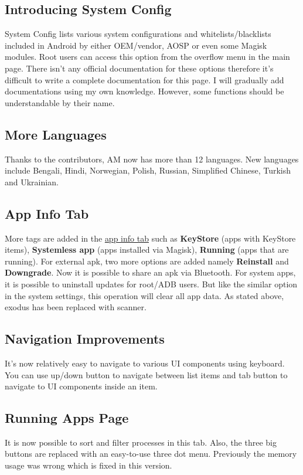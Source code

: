 \subsection{Introducing System Config}
System Config lists various system configurations and whitelists/blacklists included in Android by either OEM/vendor,
AOSP or even some Magisk modules. Root users can access this option from the overflow menu in the main page.
There isn't any official documentation for these options therefore it's difficult to write a complete documentation
for this page. I will gradually add documentations using my own knowledge. However, some functions should be
understandable by their name.

\subsection{More Languages}
Thanks to the contributors, AM now has more than 12 languages. New languages include Bengali, Hindi, Norwegian, Polish,
Russian, Simplified Chinese, Turkish and Ukrainian.

\subsection{App Info Tab}
More tags are added in the \hyperref[subsec:app-info-tab]{app info tab} such as \textbf{KeyStore} (apps with KeyStore
items), \textbf{Systemless app} (apps installed via Magisk), \textbf{Running} (apps that are running). For external apk,
two more options are added namely \textbf{Reinstall} and \textbf{Downgrade}. Now it is possible to share an apk via
Bluetooth. For system apps, it is possible to uninstall updates for root/ADB users. But like the similar option in the
system settings, this operation will clear all app data. As stated above, exodus has been replaced with scanner.

\subsection{Navigation Improvements}
It's now relatively easy to navigate to various UI components using keyboard. You can use up/down button to navigate
between list items and tab button to navigate to UI components inside an item.

\subsection{Running Apps Page}
It is now possible to sort and filter processes in this tab. Also, the three big buttons are replaced with an
easy-to-use three dot menu. Previously the memory usage was wrong which is fixed in this version.

